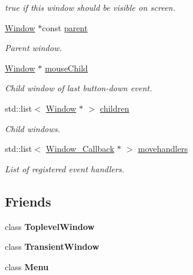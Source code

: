 \begin{DoxyCompactItemize}
\begin{DoxyCompactList}\small\item\em {\ttfamily true} if this window should be visible on screen. \end{DoxyCompactList}\item 
\hypertarget{classGUI_1_1Window_a2e593ff65e7702178d82fe9010a0b539}{\hyperlink{classGUI_1_1Window}{Window} $\ast$const \hyperlink{classGUI_1_1Window_a2e593ff65e7702178d82fe9010a0b539}{parent}}\label{classGUI_1_1Window_a2e593ff65e7702178d82fe9010a0b539}

\begin{DoxyCompactList}\small\item\em Parent window. \end{DoxyCompactList}\item 
\hyperlink{classGUI_1_1Window}{Window} $\ast$ \hyperlink{classGUI_1_1Window_addd401dab430594e678366e7ff73ef2d}{mouse\-Child}
\begin{DoxyCompactList}\small\item\em Child window of last button-\/down event. \end{DoxyCompactList}\item 
std\-::list$<$ \hyperlink{classGUI_1_1Window}{Window} $\ast$ $>$ \hyperlink{classGUI_1_1Window_ac10e617306be4367ed164ea97f5d3132}{children}
\begin{DoxyCompactList}\small\item\em Child windows. \end{DoxyCompactList}\item 
\hypertarget{classGUI_1_1Window_a5dc78efd55a14098437cc25597c21bef}{std\-::list$<$ \hyperlink{structGUI_1_1Window__Callback}{Window\-\_\-\-Callback} $\ast$ $>$ \hyperlink{classGUI_1_1Window_a5dc78efd55a14098437cc25597c21bef}{movehandlers}}\label{classGUI_1_1Window_a5dc78efd55a14098437cc25597c21bef}

\begin{DoxyCompactList}\small\item\em List of registered event handlers. \end{DoxyCompactList}\end{DoxyCompactItemize}
\subsection*{Friends}
\begin{DoxyCompactItemize}
\item 
\hypertarget{classGUI_1_1Window_a47359b01fb4f622a9770ab8b22d75a63}{class {\bfseries Toplevel\-Window}}\label{classGUI_1_1Window_a47359b01fb4f622a9770ab8b22d75a63}

\item 
\hypertarget{classGUI_1_1Window_ac4d9da9cc48d502966fd1039d5ea85fa}{class {\bfseries Transient\-Window}}\label{classGUI_1_1Window_ac4d9da9cc48d502966fd1039d5ea85fa}

\item 
\hypertarget{classGUI_1_1Window_a834cec0fab7efabab3cd53540e4d466d}{class {\bfseries Menu}}\label{classGUI_1_1Window_a834cec0fab7efabab3cd53540e4d466d}

\end{DoxyCompactItemize}


